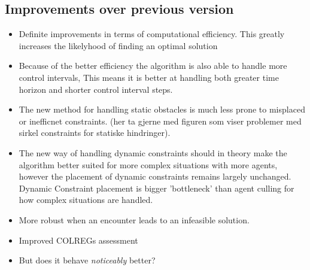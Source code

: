 \subsection{Improvements over previous version}
\begin{itemize}
    \item Definite improvements in terms of computational efficiency. This greatly increases the likelyhood of finding an optimal solution 
    \item Because of the better efficiency the algorithm is also able to handle more control intervals, This means it is better at handling both greater time horizon and shorter control interval steps.
    \item The new method for handling static obstacles is much less prone to misplaced or inefficnet constraints. (her ta gjerne med figuren som viser problemer med sirkel constraints for statiske hindringer).
    \item The new way of handling dynamic constraints should in theory make the algorithm better suited for more complex situations with more agents, however the placement of dynamic constraints remains largely unchanged.
    Dynamic Constraint placement is bigger 'bottleneck' than agent culling for how complex situations are handled. 
    \item More robust when an encounter leads to an infeasible solution.
    \item Improved COLREGs assessment
    \item But does it behave \textit{noticeably} better? 
\end{itemize}

\newpage